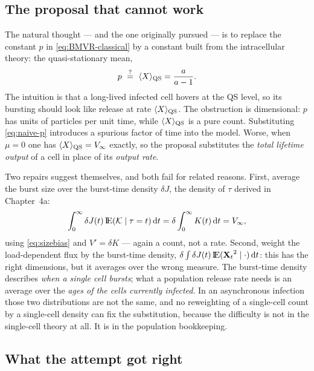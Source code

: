 \subsection{The proposal that cannot work}
\label{sec:proposal-fails}

The natural thought --- and the one originally pursued --- is to replace the
constant $p$ in \eqref{eq:BMVR-classical} by a constant built from the
intracellular theory: the quasi-stationary mean,
\begin{equation}
p\ \stackrel{?}{=}\ \langle X\rangle_{\rm QS}=\frac{a}{a-1}.
\label{eq:naive-p}
\end{equation}
The intuition is that a long-lived infected cell hovers at the QS level, so
its bursting should look like release at rate $\langle X\rangle_{\rm QS}$.
The obstruction is dimensional: $p$ has units of particles per unit time,
while $\langle X\rangle_{\rm QS}$ is a pure count. Substituting
\eqref{eq:naive-p} introduces a spurious factor of time into the model.
Worse, when $\mu=0$ one has $\langle X\rangle_{\rm QS}=V_\infty$ exactly, so
the proposal substitutes the \emph{total lifetime output} of a cell in place
of its \emph{output rate}.

Two repairs suggest themselves, and both fail for related reasons. First,
average the burst size over the burst-time density $\delta J$, the
density of $\tau$ derived in Chapter~4a:
\begin{equation}
\int_0^\infty\delta J(t)\,{\rm I}\!{\rm E}(\mathcal{K}\mid\tau=t)\,{\rm d} t
=\delta\int_0^\infty K(t)\,{\rm d} t
=V_\infty,
\end{equation}
using \eqref{eq:sizebias} and $V'=\delta K$ --- again a count, not a rate.
Second, weight the load-dependent flux by the burst-time density,
$\delta\int\delta J(t)\,{\rm I}\!{\rm E}({{\bf X}_t}^2\mid\cdot)\,{\rm d} t$: this has the right
dimensions, but it averages over the wrong measure. The burst-time density
describes \emph{when a single cell bursts}; what a population release rate
needs is an average over the \emph{ages of the cells currently infected}.
In an asynchronous infection those two distributions are not the same, and
no reweighting of a single-cell count by a single-cell density can fix the
substitution, because the difficulty is not in the single-cell theory at
all. It is in the population bookkeeping.

\subsection{What the attempt got right}
\label{sec:attempt-right}

